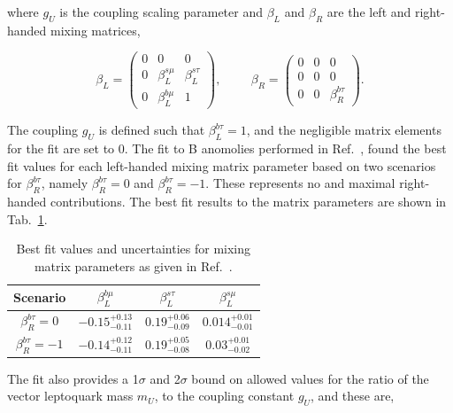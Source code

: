 where $g_{U}$ is the coupling scaling parameter and $\beta_{L}$ and $\beta_{R}$ are the left and right-handed mixing matrices,

\begin{equation}
\beta_{L} = 
\begin{pmatrix}
0 & 0 & 0 \\
0 & \beta_{L}^{s\mu} & \beta_{L}^{s\tau} \\
0 & \beta_{L}^{b\mu} & 1
\end{pmatrix},
\hspace{1cm}
\beta_{R} = 
\begin{pmatrix}
0 & 0 & 0 \\
0 & 0 & 0 \\
0 & 0 & \beta_{R}^{b\tau}
\end{pmatrix}.
\end{equation}

The coupling $g_{U}$ is defined such that $\beta_{L}^{b\tau}=1$, and the negligible matrix elements for the fit are set to 0.
The fit to B anomolies performed in Ref.~\cite{Cornella:2021sby}, found the best fit values for each left-handed mixing matrix parameter based on two scenarios for $\beta^{b\tau}_{R}$, namely $\beta^{b\tau}_{R} = 0$ and $\beta^{b\tau}_{R} = -1$.
These represents no and maximal right-handed contributions. 
The best fit results to the matrix parameters are shown in Tab.~\ref{tab:vlq_bestfit}.

\begin{table}[h]
\centering
\begin{tabular}{|c|c|c|c|}
\hline
Scenario & $\beta^{b\mu}_{L}$ & $\beta^{s\tau}_{L}$ & $\beta^{s\mu}_{L}$ \\
\hline
\hline
$\beta^{b\tau}_{R}=0$ & $-0.15^{+0.13}_{-0.11}$ & $0.19^{+0.06}_{-0.09}$ & $0.014^{+0.01}_{-0.01}$ \\
$\beta^{b\tau}_{R}=-1$ & $-0.14^{+0.12}_{-0.11}$ & $0.19^{+0.05}_{-0.08}$ & $0.03^{+0.01}_{-0.02}$ \\
\hline
\end{tabular}
\caption{Best fit values and uncertainties for mixing matrix parameters as given in Ref.~\cite{Cornella:2021sby}.}
\label{tab:vlq_bestfit}
\end{table}

The fit also provides a 1$\sigma$ and 2$\sigma$ bound on allowed values for the ratio of the vector leptoquark mass $m_{U}$, to the coupling constant $g_{U}$, and these are,

